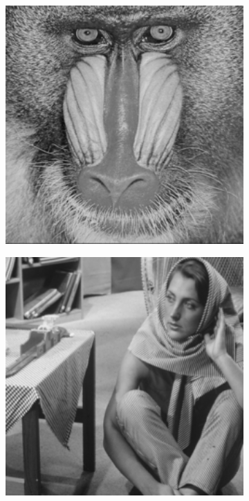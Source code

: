 \begin{figure}
\begin{subfigure}[b]{0.09\textwidth}
    \end{subfigure}
    \hfill
    \begin{subfigure}[b]{0.09\textwidth}
        \centering
        \includegraphics[width=1\textwidth]{images/pgpd/baboon.png}
    \end{subfigure}
    \hfill
    \begin{subfigure}[b]{0.09\textwidth}
        \centering
        \includegraphics[width=1\textwidth]{images/pgpd/barbara.png}

\end{subfigure}
\end{figure}
